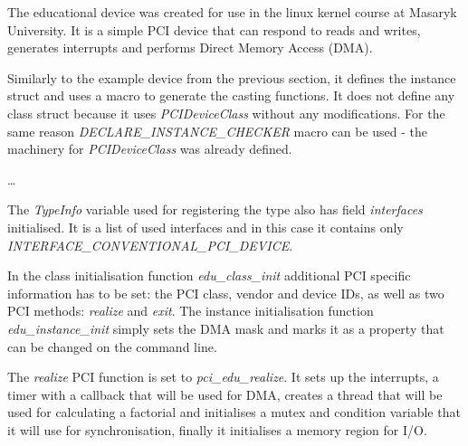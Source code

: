 
The educational device was created for use in the linux kernel course at
Masaryk University. It is a simple PCI device that can respond to reads and
writes, generates interrupts and performs Direct Memory Access (DMA).

Similarly to the example device from the previous section, it defines the
instance struct and uses a macro to generate the casting functions. It does not
define any class struct because it uses \emph{PCIDeviceClass} without any
modifications. For the same reason \emph{DECLARE\_INSTANCE\_CHECKER} macro can
be used - the machinery for \emph{PCIDeviceClass} was already defined. 

\begin{codeblock}
    
    \dots
    
\end{codeblock}

The \emph{TypeInfo} variable used for registering the type also has field
\emph{interfaces} initialised. It is a list of used interfaces and in this case
it contains only \emph{INTERFACE\_CONVENTIONAL\_PCI\_DEVICE}.

\begin{codeblock}
    
\end{codeblock}

In the class initialisation function \emph{edu\_class\_init} additional PCI
specific information has to be set: the PCI class, vendor and device IDs, as
well as two PCI methods: \emph{realize} and \emph{exit}. The instance
initialisation function \emph{edu\_instance\_init} simply sets the DMA mask and
marks it as a property that can be changed on the command line.

\begin{codeblock}
    
\end{codeblock}

The \emph{realize} PCI function is set to \emph{pci\_edu\_realize}. It sets up
the interrupts, a timer with a callback that will be used for DMA, creates
a thread that will be used for calculating a factorial and initialises a mutex
and condition variable that it will use for synchronisation, finally it
initialises a memory region for I/O.

